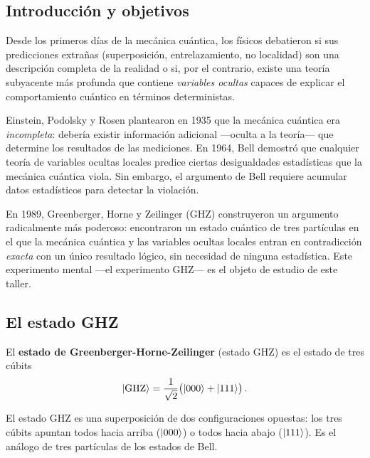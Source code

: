 \documentclass[]{unirTema}
\author{Fr Ancisco Costa Cano}
\begin{document}

\subsection{Introducción y objetivos}

Desde los primeros días de la mecánica cuántica, los físicos debatieron si sus predicciones extrañas (superposición, entrelazamiento, no localidad) son una descripción completa de la realidad o si, por el contrario, existe una teoría subyacente más profunda que contiene \textit{variables ocultas} capaces de explicar el comportamiento cuántico en términos deterministas.

Einstein, Podolsky y Rosen plantearon en 1935 que la mecánica cuántica era \textit{incompleta}: debería existir información adicional —oculta a la teoría— que determine los resultados de las mediciones. En 1964, Bell demostró que cualquier teoría de variables ocultas locales predice ciertas desigualdades estadísticas que la mecánica cuántica viola. Sin embargo, el argumento de Bell requiere acumular datos estadísticos para detectar la violación.

En 1989, Greenberger, Horne y Zeilinger (GHZ) construyeron un argumento radicalmente más poderoso: encontraron un estado cuántico de tres partículas en el que la mecánica cuántica y las variables ocultas locales entran en contradicción \textit{exacta} con un único resultado lógico, sin necesidad de ninguna estadística. Este experimento mental —el experimento GHZ— es el objeto de estudio de este taller.

\subsection{El estado GHZ}

\begin{defi}
  El \textbf{estado de Greenberger-Horne-Zeilinger} (estado GHZ) es el estado de tres cúbits
  \[
    \ket{\text{GHZ}} = \frac{1}{\sqrt{2}}\bigl(\ket{000} + \ket{111}\bigr)\,.
  \]
\end{defi}

El estado GHZ es una superposición de dos configuraciones opuestas: los tres cúbits apuntan todos hacia arriba ($\ket{000}$) o todos hacia abajo ($\ket{111}$). Es el análogo de tres partículas de los estados de Bell.
\end{document}
